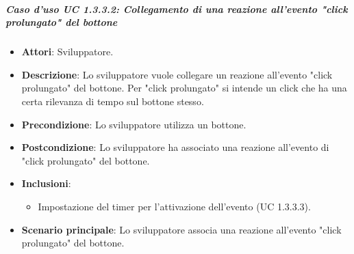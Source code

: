 \subparagraph{Caso d'uso UC 1.3.3.2: Collegamento di una reazione all'evento "click prolungato" del bottone}

\FloatBarrier
\begin{itemize}
\item\textbf{Attori}: Sviluppatore.
\item\textbf{Descrizione}: Lo sviluppatore vuole collegare un reazione all'evento "click prolungato" del bottone. Per "click prolungato" si intende un click che ha una certa rilevanza di tempo sul bottone stesso.
\item\textbf{Precondizione}: Lo sviluppatore utilizza un bottone.
\item\textbf{Postcondizione}: Lo sviluppatore ha associato una reazione all'evento di "click prolungato" del bottone.
\item \textbf{Inclusioni}:
\begin{itemize}
\item Impostazione del timer per l'attivazione dell'evento (UC 1.3.3.3).
\end{itemize} 
\item\textbf{Scenario principale}: Lo sviluppatore associa una reazione all'evento "click prolungato" del bottone.
\end{itemize}
